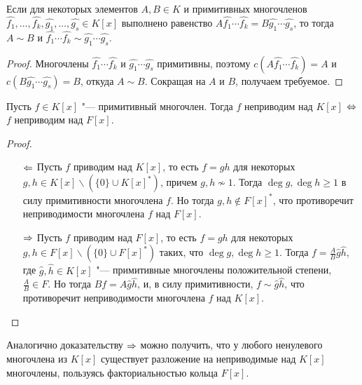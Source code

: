 \begin{corollary}
	Если для некоторых элементов $A, B \in K$ и примитивных многочленов $\widehat{f_1}, \dotsc, \widehat{f_k}, \widehat{g_1}, \dotsc, \widehat{g_s} \in K[x]$ выполнено равенство $A\widehat{f_1}\dotsm\widehat{f_k} = B\widehat{g_1}\dotsm\widehat{g_s}$, то тогда $A \sim B$ и $\widehat{f_1}\dotsm\widehat{f_k} \sim \widehat{g_1}\dotsm\widehat{g_s}$.
\end{corollary}

\begin{proof}
	Многочлены $\widehat{f_1}\dotsm\widehat{f_k}$ и $\widehat{g_1}\dotsm\widehat{g_s}$ примитивны, поэтому $c(A\widehat{f_1}\dotsm\widehat{f_k}) = A$ и $c(B\widehat{g_1}\dotsm\widehat{g_s}) = B$, откуда $A \sim B$. Сокращая на $A$ и $B$, получаем требуемое.
\end{proof}

\begin{proposition}
	Пусть $f \in K[x]$ "--- примитивный многочлен. Тогда $f$ неприводим над $K[x]$ $\Leftrightarrow$ $f$ неприводим над $F[x]$.
\end{proposition}

\begin{proof}~
	\begin{itemize}
		\item[$\Leftarrow$] Пусть $f$ приводим над $K[x]$, то есть $f = gh$ для некоторых $g, h \in K[x] \backslash (\{0\} \cup K[x]^*)$, причем $g, h \not\sim 1$. Тогда $\deg{g}, \deg{h} \ge 1$ в силу примитивности многочлена $f$. Но тогда $g, h \not\in F[x]^*$, что противоречит неприводимости многочлена $f$ над $F[x]$.
		\item[$\Rightarrow$] Пусть $f$ приводим над $F[x]$, то есть $f = gh$ для некоторых $g, h \in F[x] \backslash (\{0\} \cup F[x]^*)$ таких, что $\deg{g}, \deg{h} \ge 1$. Тогда $f = \frac{A}{B}\widehat{g}\widehat{h}$, где $\widehat{g}, \widehat{h} \in K[x]$ "--- примитивные многочлены положительной степени, $\frac AB \in F$. Но тогда $Bf = A\widehat{g}\widehat{h}$, и, в силу примитивности, $f \sim \widehat{g}\widehat{h}$, что противоречит неприводимости многочлена $f$ над $K[x]$.\qedhere
	\end{itemize}
\end{proof}

\begin{note}
	Аналогично доказательству $\Rightarrow$ можно получить, что у любого ненулевого многочлена из $K[x]$ существует разложение на неприводимые над $K[x]$ многочлены, пользуясь факториальностью кольца $F[x]$.
\end{note}

